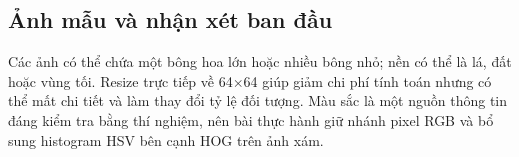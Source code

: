 
\subsection{Ảnh mẫu và nhận xét ban đầu}
Các ảnh có thể chứa một bông hoa lớn hoặc nhiều bông nhỏ; nền có thể là lá, đất hoặc vùng tối. Resize trực tiếp về 64\(\times\)64 giúp giảm chi phí tính toán nhưng có thể mất chi tiết và làm thay đổi tỷ lệ đối tượng. Màu sắc là một nguồn thông tin đáng kiểm tra bằng thí nghiệm, nên bài thực hành giữ nhánh pixel RGB và bổ sung histogram HSV bên cạnh HOG trên ảnh xám.
